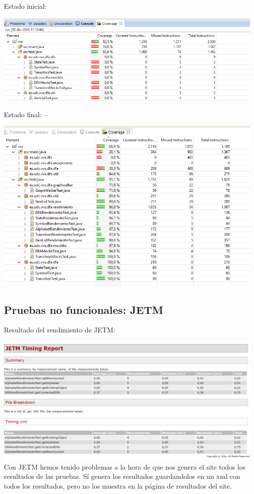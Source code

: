 \documentclass[DIV=calc,paper=a4,fontsize=11pt,onecolumn]{scrartcl} %
\begin{document}
	Estado inicial:
	
	
		\includegraphics[width=15cm]{Imagenes/sinCobertura.png}
	
	
	Estado final:
	--
	
		\includegraphics[width=15cm]{Imagenes/Cobertura.png}
	
	\subsection{Pruebas no funcionales: JETM}
	Resultado del rendimiento de JETM:
	
		\includegraphics[width=16cm]{Imagenes/JEMReport.png} \\
	Con JETM hemos tenido problemas  a la hora de que nos genera el site todos los resultados de las pruebas. Sí genera los resultados guardandolos en un xml con todos los resultados, pero no los muestra en la página de resultados del site.
\end{document}
